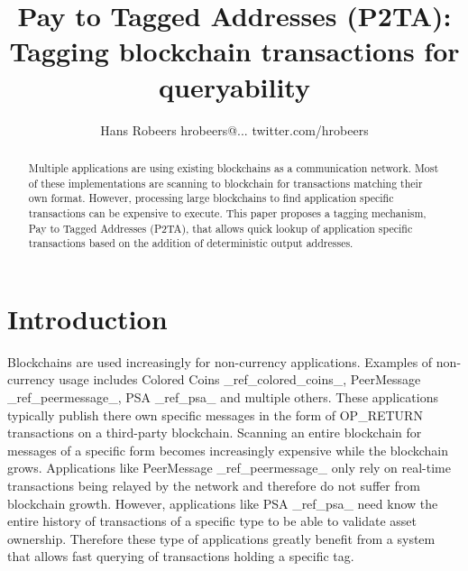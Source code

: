 \documentclass[a4paper,10pt]{article}
\title{Pay to Tagged Addresses (P2TA): Tagging blockchain transactions for queryability}
\author{Hans Robeers hrobeers@... twitter.com/hrobeers}
\begin{document}
\maketitle

\begin{abstract}
Multiple applications are using existing blockchains as a communication network.
Most of these implementations are scanning to blockchain for transactions matching their own format.
However, processing large blockchains to find application specific transactions can be expensive to execute.
This paper proposes a tagging mechanism, Pay to Tagged Addresses (P2TA), that allows quick lookup of application specific transactions based on the addition of deterministic output addresses.
\end{abstract}

\section{Introduction}
Blockchains are used increasingly for non-currency applications.
Examples of non-currency usage includes Colored Coins \_ref\_colored\_coins\_, PeerMessage \_ref\_peermessage\_, PSA \_ref\_psa\_ and multiple others.
These applications typically publish there own specific messages in the form of OP\_RETURN transactions on a third-party blockchain.
Scanning an entire blockchain for messages of a specific form becomes increasingly expensive while the blockchain grows.
Applications like PeerMessage \_ref\_peermessage\_ only rely on real-time transactions being relayed by the network and therefore do not suffer from blockchain growth.
However, applications like PSA \_ref\_psa\_ need know the entire history of transactions of a specific type to be able to validate asset ownership.
Therefore these type of applications greatly benefit from a system that allows fast querying of transactions holding a specific tag.
\end{document}
